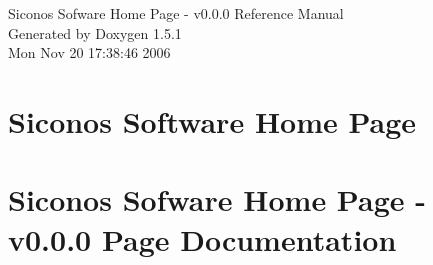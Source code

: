 \documentclass[a4paper]{book}
\begin{document}
\begin{titlepage}
\vspace*{7cm}
\begin{center}
{\Large Siconos Sofware Home Page - v0.0.0 Reference Manual}\\
\vspace*{1cm}
{\large Generated by Doxygen 1.5.1}\\
\vspace*{0.5cm}
{\small Mon Nov 20 17:38:46 2006}\\
\end{center}
\end{titlepage}
\clearemptydoublepage
{}
\tableofcontents
\clearemptydoublepage
{}
\chapter{Siconos Software Home Page }
\label{index}\hypertarget{index}{}
\chapter{Siconos Sofware Home Page - v0.0.0 Page Documentation}




\printindex
\end{document}
